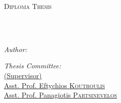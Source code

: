 \documentclass[
	12pt, %
	english, %
	onehalfspacing, %
	liststotoc, %
	toctotoc, %
	parskip, %
	headsepline, %
]{MastersDoctoralThesis} %
\author{Christos \textsc{Spyridakis}} %
\begin{document}
\frontmatter %

\pagestyle{plain} %

\begin{titlepage}
	\begin{center}

		\vspace*{.01\textheight}
		{\scshape\LARGE \univname\par}\vspace{0.2cm} %
		\textsc{\Large Diploma Thesis}\\[0.15cm] %

		\HRule \\[0.3cm] %
		{\huge \bfseries \ttitle\par}\vspace{0.3cm} %
		\HRule \\[0.05cm] %

		\begin{minipage}[t]{0.32\textwidth}
			\begin{flushleft} \large
				\emph{Author:}\\
				\href{https://www.linkedin.com/in/cspyridakis}{\authorname} %
			\end{flushleft}
		\end{minipage}
		\begin{minipage}[t]{0.59\textwidth}
			\begin{flushright} \large
				\emph{Thesis Committee:} \\
				\href{https://www.ece.tuc.gr/index.php?id=4531&tx_tuclabspersonnel_list%5Bperson%5D=289&tx_tuclabspersonnel_list%5Baction%5D=person&tx_tuclabspersonnel_list%5Bcontroller%5D=List}{\supname \hspace{.1cm}(Supervisor)}\\ %
				\href{https://www.ece.tuc.gr/index.php?id=4531&tx_tuclabspersonnel_list%5Bperson%5D=79&tx_tuclabspersonnel_list%5Baction%5D=person&tx_tuclabspersonnel_list%5Bcontroller%5D=List}{Asst. Prof. Eftychios \textsc{Koutroulis}}\\
				\href{https://www.tuc.gr/index.php?id=5643&tx_tuclabspersonnel_pi3%5Bpersonid%5D=347}{Asst. Prof. Panagiotis \textsc{Partsinevelos}}
			\end{flushright}
		\end{minipage}\\[0.42cm]


\end{center}
\end{titlepage}
\end{document}
